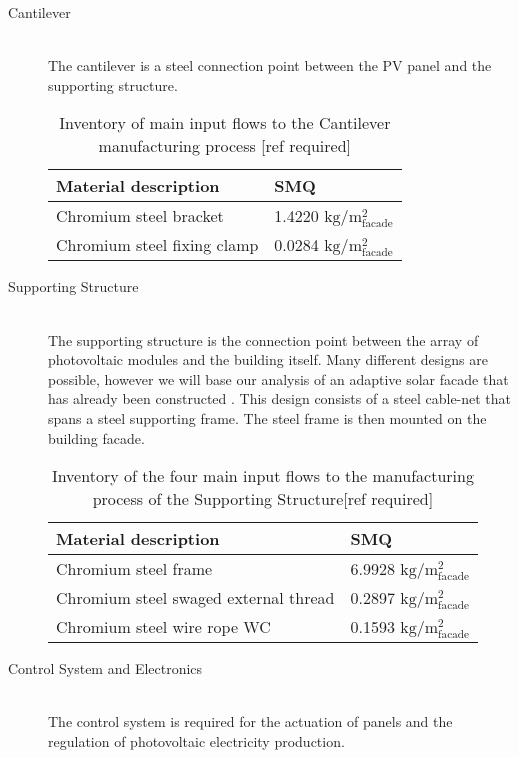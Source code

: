 \begin{description}
\item[Cantilever] \hfill \\
The cantilever is a steel connection point between the PV panel and the supporting structure.\\

\begin{table}[H]
\centering
\begin{tabular}{ll}
\hline
Material description & SMQ \\ \hline
Chromium steel bracket	 & 1.4220 ${\mathrm{kg/m^2_{facade}}}$ \\
Chromium steel fixing clamp  & 0.0284 ${\mathrm{kg/m^2_{facade}}}$\\
\hline
\end{tabular}
\caption{Inventory of main input flows to the Cantilever manufacturing process [ref required]}
\label{tab:CantileverInv}
\end{table}

\item[Supporting Structure] \hfill \\
The supporting structure is the connection point between the array of photovoltaic modules and the building itself. Many different designs are possible, however we will base our analysis of an adaptive solar facade that has already been constructed \cite{nagy2015frontiers}. This design consists of a steel cable-net that spans a steel supporting frame. The steel frame is then mounted on the building facade.\\

\begin{table}[H]
\centering
\begin{tabular}{ll}
\hline
Material description & SMQ \\ \hline
Chromium steel frame & 6.9928 ${\mathrm{kg/m^2_{facade}}}$ \\
Chromium steel swaged external thread  &0.2897 ${\mathrm{kg/m^2_{facade}}}$\\
Chromium steel wire rope WC  & 0.1593 ${\mathrm{kg/m^2_{facade}}}$\\
\hline
\end{tabular}
\caption{Inventory of the four main input flows to the manufacturing process of the Supporting Structure[ref required]}
\label{tab:StructureInv}
\end{table}

\item[Control System and Electronics] \hfill \\
The control system is required for the actuation of panels and the regulation of photovoltaic electricity production.\\


\end{description}
